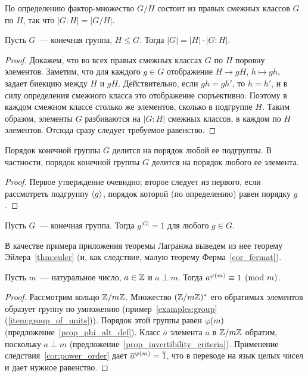 \begin{remark}
По определению фактор-множество $G/H$ состоит из правых смежных
классов $G$ по $H$, так что $|G:H| = |G/H|$.
\end{remark}

\begin{theorem}
Пусть $G$~--- конечная группа, $H\leq G$. Тогда
$|G| = |H|\cdot |G:H|$.
\end{theorem}
\begin{proof}
Докажем, что во всех правых смежных классах $G$ по $H$ поровну
элементов. Заметим, что для каждого $g\in G$ отображение $H\to gH$,
$h\mapsto gh$, задает биекцию между $H$ и $gH$. Действительно, если
$gh=gh'$, то $h=h'$, и в силу определения смежного класса это
отображение сюръективно. Поэтому в каждом смежном классе столько же
элементов, сколько в подгруппе $H$. Таким образом, элементы $G$
разбиваются на $|G:H|$ смежных классов, в каждом по $H$
элементов. Отсюда сразу следует требуемое равенство.
\end{proof}
\begin{corollary}\label{cor:order_divides}
Порядок конечной группы $G$ делится на порядок любой ее подгруппы. В
частности, порядок конечной группы $G$ делится на порядок любого ее
элемента.
\end{corollary}
\begin{proof}
Первое утверждение очевидно; второе следует из первого, если
рассмотреть подгруппу $\langle g\rangle$, порядок которой (по определению)
равен порядку $g$.
\end{proof}

\begin{corollary}\label{cor:power_order}
Пусть $G$~--- конечная группа. Тогда $g^{|G|} = 1$ для любого $g\in G$.
\end{corollary}

В качестве примера приложения теоремы Лагранжа выведем из нее теорему
Эйлера~\ref{thm:euler} (и, как следствие, малую теорему
Ферма~\ref{cor_fermat}).

\begin{theorem}
Пусть $m$~--- натуральное число, $a\in\mathbb Z$ и $a\perp m$. Тогда
$a^{\varphi(m)}\equiv 1\pmod m$.
\end{theorem}
\begin{proof}
Рассмотрим кольцо $\mathbb Z/m\mathbb Z$. Множество $(\mathbb Z/m\mathbb Z)^*$ его
обратимых элементов образует группу по умножению
(пример~\ref{examples:group} (\ref{item:group_of_units})). Порядок этой
группы равен $\varphi(m)$ (предложение~\ref{prop_phi_alt_def}).
Класс $\overline{a}$ элемента $a$ в $\mathbb Z/m\mathbb Z$ обратим, поскольку
$a\perp m$ (предложение~\ref{prop_invertibility_criteria}).
Применение следствия~\ref{cor:power_order} дает
$\overline{a}^{\varphi(m)}=\overline{1}$, что в переводе на язык целых
чисел и дает нужное равенство.
\end{proof}


